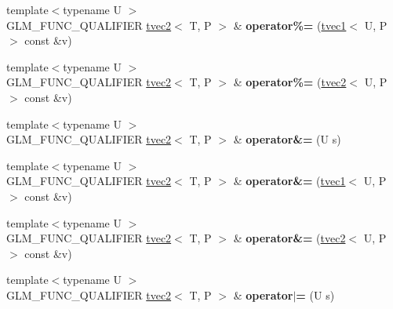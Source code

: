 \begin{DoxyCompactItemize}
\item 
\hypertarget{structglm_1_1tvec2_aea6f1233a9ef7b8c12cee037fa5f7b9d}{{\footnotesize template$<$typename U $>$ }\\G\-L\-M\-\_\-\-F\-U\-N\-C\-\_\-\-Q\-U\-A\-L\-I\-F\-I\-E\-R \hyperlink{structglm_1_1tvec2}{tvec2}$<$ T, P $>$ \& {\bfseries operator\%=} (\hyperlink{structglm_1_1tvec1}{tvec1}$<$ U, P $>$ const \&v)}\label{structglm_1_1tvec2_aea6f1233a9ef7b8c12cee037fa5f7b9d}

\item 
\hypertarget{structglm_1_1tvec2_aaf4c73ee8e801c26093def1d49df1df1}{{\footnotesize template$<$typename U $>$ }\\G\-L\-M\-\_\-\-F\-U\-N\-C\-\_\-\-Q\-U\-A\-L\-I\-F\-I\-E\-R \hyperlink{structglm_1_1tvec2}{tvec2}$<$ T, P $>$ \& {\bfseries operator\%=} (\hyperlink{structglm_1_1tvec2}{tvec2}$<$ U, P $>$ const \&v)}\label{structglm_1_1tvec2_aaf4c73ee8e801c26093def1d49df1df1}

\item 
\hypertarget{structglm_1_1tvec2_afc9d22cc673a07d00522e2ab3af5e465}{{\footnotesize template$<$typename U $>$ }\\G\-L\-M\-\_\-\-F\-U\-N\-C\-\_\-\-Q\-U\-A\-L\-I\-F\-I\-E\-R \hyperlink{structglm_1_1tvec2}{tvec2}$<$ T, P $>$ \& {\bfseries operator\&=} (U s)}\label{structglm_1_1tvec2_afc9d22cc673a07d00522e2ab3af5e465}

\item 
\hypertarget{structglm_1_1tvec2_a061aeb63e00510f372dc949c7ad5af98}{{\footnotesize template$<$typename U $>$ }\\G\-L\-M\-\_\-\-F\-U\-N\-C\-\_\-\-Q\-U\-A\-L\-I\-F\-I\-E\-R \hyperlink{structglm_1_1tvec2}{tvec2}$<$ T, P $>$ \& {\bfseries operator\&=} (\hyperlink{structglm_1_1tvec1}{tvec1}$<$ U, P $>$ const \&v)}\label{structglm_1_1tvec2_a061aeb63e00510f372dc949c7ad5af98}

\item 
\hypertarget{structglm_1_1tvec2_a9b368287482b9a3218f99cc238d0ac97}{{\footnotesize template$<$typename U $>$ }\\G\-L\-M\-\_\-\-F\-U\-N\-C\-\_\-\-Q\-U\-A\-L\-I\-F\-I\-E\-R \hyperlink{structglm_1_1tvec2}{tvec2}$<$ T, P $>$ \& {\bfseries operator\&=} (\hyperlink{structglm_1_1tvec2}{tvec2}$<$ U, P $>$ const \&v)}\label{structglm_1_1tvec2_a9b368287482b9a3218f99cc238d0ac97}

\item 
\hypertarget{structglm_1_1tvec2_a6c2df1c878a51c43ac42dd2ff1096cf7}{{\footnotesize template$<$typename U $>$ }\\G\-L\-M\-\_\-\-F\-U\-N\-C\-\_\-\-Q\-U\-A\-L\-I\-F\-I\-E\-R \hyperlink{structglm_1_1tvec2}{tvec2}$<$ T, P $>$ \& {\bfseries operator$\vert$=} (U s)}\label{structglm_1_1tvec2_a6c2df1c878a51c43ac42dd2ff1096cf7}


\end{DoxyCompactItemize}
